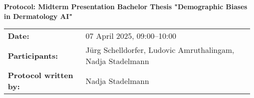 \documentclass[a4paper,11pt]{article}
\begin{document}
	
	\begin{center}
		\Large \textbf{Protocol: Midterm Presentation Bachelor Thesis "Demographic Biases in Dermatology AI"}
	\end{center}
	
	\vspace{1em}
	
	\begin{tabular}{p{4cm}p{11.5cm}}
		\textbf{Date:} & 07 April 2025, 09:00–10:00 \\
		\textbf{Participants:} & Jürg Schelldorfer, Ludovic Amruthalingam, Nadja Stadelmann \\
		\textbf{Protocol written by:} & Nadja Stadelmann \\
	\end{tabular}
	
	\vspace{1em}
	
\end{document}
